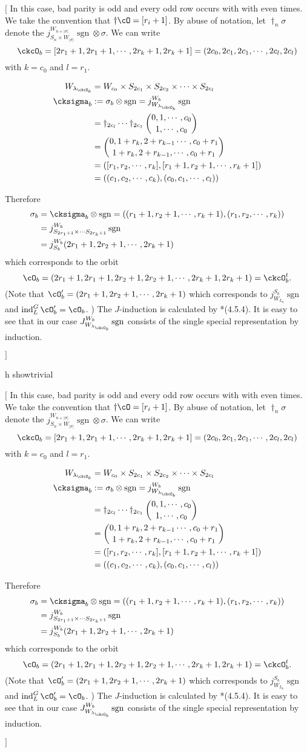 \documentclass[12pt,a4paper]{amsart}
\newcommand{\trivial}[2][]{\if\relax\detokenize{#1}\relax
  {%
      \color{orange} \vspace{0em} $[$  #2 $]$
      \color{black}
  }
  \else
\ifx#1h
\ifcsname showtrivial\endcsname
{%
    \color{orange} \vspace{0em}  $[$ #2 $]$
    \color{black}
}
\fi
\else {\red Wrong argument!} \fi
\fi
}
\def\abs#1{\left|{#1}\right|}
\DeclareMathOperator{\ind}{ind}
\newcommand{\sgn}{\operatorname{sgn}}
\numberwithin{equation}{section}
\theoremstyle{remark}
\def\lamckb{\lambda_{\ckcO_b}}
\begin{document}
\trivial{
  In this case, bad parity is odd and every odd row occurs with with even times.
  We take the convention that
  $\dagger \cO = [r_{i}+1]$.
  By abuse of notation, let $\dagger_{n} \sigma$  denote the
  $j_{S_{n} \times W_{\abs{\sigma}}}^{W_{n+\abs{\sigma}}} \sgn\otimes \sigma$.
  We can write
  \[
    \ckcO_{b} = [2r_{1}+1, 2r_{1}+1, \cdots, 2r_{k}+1,2r_{k}+1]
    = (2c_{0},2c_{1},2c_{1}, \cdots, 2c_{l}, 2c_{l})
  \]
  with $k = c_{0}$ and $l = r_{1}$.

\[
\begin{split}
  W_{\lamckb} &= W_{c_{0}} \times S_{2c_{1}} \times S_{2c_{2}}\times \cdots \times S_{2c_{l}}\\
  \cksigma_{b} &:= \sigma_{b}\otimes \sgn = j_{W_{\lamckb}}^{W_{b}} \sgn \\
  & = \dagger_{2c_{l}}\cdots \dagger_{2c_{1}}
  \binom{0, 1, \cdots, c_{0}}{1, \cdots, c_{0}}\\
  & =
  \binom{0, 1+r_{k}, 2+r_{k-1}\cdots, c_{0}+r_{1}}{1+r_{k},2+r_{k-1}, \cdots, c_{0}+r_{1}}\\
  & = ([r_{1},r_{2},\cdots, r_{k}],[r_{1}+1,r_{2}+1,\cdots,r_{k}+1])\\
  &= ((c_{1},c_{2},\cdots, c_{k}),(c_{0},c_{1}, \cdots, c_{l}))\\
\end{split}
\]

Therefore
\[
  \begin{split}
    \sigma_{b} &= \cksigma_{b}\otimes \sgn = ((r_{1}+1,r_{2}+1,\cdots,r_{k}+1),(r_{1},r_{2},\cdots, r_{k})) \\
    & = j_{S_{2r_{1}+1}\times \cdots S_{2r_{k}+1}}^{W_{b}} \sgn\\
    & = j_{S_{b}}^{W_{b}} (2r_{1}+1, 2r_{2}+1, \cdots, 2r_{k}+1)
  \end{split}
\]
which corresponds to the orbit
\[
  \cO_{b} = (2r_{1}+1, 2r_{1}+1,2r_{2}+1, 2r_{2}+1,  \cdots,2r_{k}+1, 2r_{k}+1 ) = \ckcO_{b}^{t}.
\]
(Note that $\cO'_{b} = (2r_{1}+1,2r_{2}+1, \cdots, 2r_{k}+1)$ which corresponds
to $j_{W_{L_{b}}}^{S_{b}}\sgn$ and $\ind_{L}^{G} \cO'_{b} = \cO_{b}$.
)
The $J$-induction is calculated by \cite{Lu}*{(4.5.4)}.
It is easy to see that in our case $J_{W_{\lamckb}}^{W_{b}} \sgn$ consists of
the single special representation by induction.


}
\end{document}

